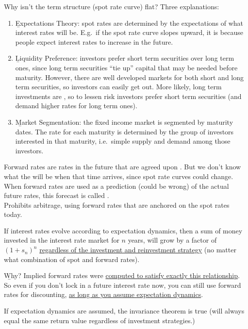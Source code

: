 Why isn't the term structure (spot rate curve) flat? Three explanations:
\begin{enumerate}[label=(\arabic*)]
    \item \b{Expectations Theory}: spot rates are determined by the expectations of what interest rates will be. E.g.\ if the spot rate curve slopes upward, it is because people expect interest rates to increase in the future.
    \item \b{Liquidity Preference}: investors prefer short term securities over long term ones, since long term securities ``tie up'' capital that may be needed before maturity. However, there are well developed markets for both short and long term securities, so investors can easily get out. More likely, long term investments are , so to lessen risk investors prefer short term securities (and demand higher rates for long term ones).
    \item \b{Market Segmentation}: the fixed income market is segmented by maturity dates. The rate for each maturity is determined by the group of investors interested in that maturity, i.e.\ simple supply and demand among those investors.
\end{enumerate}

Forward rates are rates in the future that are agreed upon . But we don't know what the  will be when that time arrives, since spot rate curves could change.
When forward rates are used as a prediction (could be wrong) of the actual future rates, this forecast is called .
\\Prohibits arbitrage, using forward rates that are anchored on the spot rates today.

If interest rates evolve according to expectation dynamics, then a sum of money invested in the interest rate market for $n$ years, will grow by a factor of $(1+s_n)^n$ \ul{regardless of the investment and reinvestment strategy} (no matter what combination of spot and forward rates).

\begin{center}
\end{center}

\b{Why?} Implied forward rates were \ul{computed to satisfy exactly this relationship}.
\\So even if you don't lock in a future interest rate now, you can still use forward rates for discounting, \ul{as long as you assume expectation dynamics}.


If expectation dynamics are assumed, the invariance theorem is true (will always equal the same return value regardless of investment strategies.)
